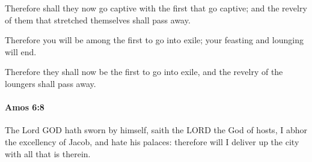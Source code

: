 			\begin{versebox}
					\item[BHS] 
					\item[LXX] 
					\item[ASV] Therefore shall they now go captive with the first that go captive; and the revelry of them that stretched themselves shall pass away.
					\item[NIV] Therefore you will be among the first to go into exile; your feasting and lounging will end.
					\item[NRSV] Therefore they shall now be the first to go into exile, and the revelry of the loungers shall pass away.
			\end{versebox}

		\paragraph{Amos 6:8} %
			\label{AMOS-6-8}

			The Lord GOD hath sworn by himself, saith the LORD the God of hosts, I abhor the excellency of Jacob, and hate his palaces: therefore will I deliver up the city with all that is therein.

